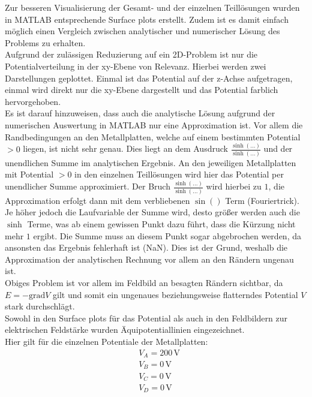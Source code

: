 Zur besseren Visualisierung der Gesamt- und der einzelnen Teillösungen wurden in MATLAB entsprechende Surface plots erstellt. Zudem ist es damit einfach möglich einen Vergleich zwischen analytischer und numerischer Lösung des Problems zu erhalten. \\

Aufgrund der zulässigen Reduzierung auf ein 2D-Problem ist nur die Potentialverteilung in der xy-Ebene von Relevanz. Hierbei werden zwei Darstellungen geplottet. Einmal ist das Potential auf der z-Achse aufgetragen, einmal wird direkt nur die xy-Ebene dargestellt und das Potential farblich hervorgehoben. \\

Es ist darauf hinzuweisen, dass auch die analytische Lösung aufgrund der numerischen Auswertung in MATLAB nur eine Approximation ist. Vor allem die Randbedingungen an den Metallplatten, welche auf einem bestimmten Potential $>0$ liegen, ist nicht sehr genau. Dies liegt an dem Ausdruck $\frac{\sinh(...)}{\sinh(...)}$ und der unendlichen Summe im analytischen Ergebnis. An den jeweiligen Metallplatten mit Potential $>0$ in den einzelnen Teillösungen wird hier das Potential per unendlicher Summe approximiert. Der Bruch $\frac{\sinh(...)}{\sinh(...)}$ wird hierbei zu $1$, die Approximation erfolgt dann mit dem verbliebenen $\sin()$ Term (\glqq Fouriertrick\grqq{}). Je höher jedoch die Laufvariable der Summe wird, desto größer werden auch die $\sinh$ Terme, was ab einem gewissen Punkt dazu führt, dass die Kürzung nicht mehr $1$ ergibt. Die Summe muss an diesem Punkt sogar abgebrochen werden, da ansonsten das Ergebnis fehlerhaft ist (\glqq NaN\grqq{}). Dies ist der Grund, weshalb die Approximation der analytischen Rechnung vor allem an den Rändern ungenau ist. \\

Obiges Problem ist vor allem im Feldbild an besagten Rändern sichtbar, da $E = -\mathrm{grad}V$ gilt und somit ein ungenaues beziehungsweise flatterndes Potential $V$ stark durchschlägt. \\

Sowohl in den Surface plots für das Potential als auch in den Feldbildern zur elektrischen Feldstärke wurden Äquipotentiallinien eingezeichnet. \\

Hier gilt für die einzelnen Potentiale der Metallplatten:
\begin{align*}
	&V_A = 200\,\mathrm{V} \\
	&V_B = 0\,\mathrm{V} \\
	&V_C = 0\,\mathrm{V} \\
	&V_D = 0\,\mathrm{V}
\end{align*}

